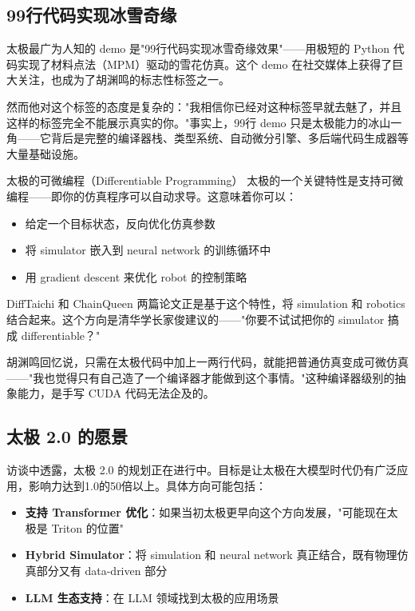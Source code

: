\documentclass[a4paper]{article}
\begin{document}
\subsection{99行代码实现冰雪奇缘}

太极最广为人知的 demo 是"99行代码实现冰雪奇缘效果"——用极短的 Python 代码实现了材料点法（MPM）驱动的雪花仿真。这个 demo 在社交媒体上获得了巨大关注，也成为了胡渊鸣的标志性标签之一。

然而他对这个标签的态度是复杂的："我相信你已经对这种标签早就去魅了，并且这样的标签完全不能展示真实的你。"事实上，99行 demo 只是太极能力的冰山一角——它背后是完整的编译器栈、类型系统、自动微分引擎、多后端代码生成器等大量基础设施。

\begin{knowledgebox}{太极的可微编程（Differentiable Programming）}
太极的一个关键特性是支持可微编程——即你的仿真程序可以自动求导。这意味着你可以：
\begin{itemize}
\item 给定一个目标状态，反向优化仿真参数
\item 将 simulator 嵌入到 neural network 的训练循环中
\item 用 gradient descent 来优化 robot 的控制策略
\end{itemize}
DiffTaichi 和 ChainQueen 两篇论文正是基于这个特性，将 simulation 和 robotics 结合起来。这个方向是清华学长家俊建议的——"你要不试试把你的 simulator 搞成 differentiable？"
\end{knowledgebox}

胡渊鸣回忆说，只需在太极代码中加上一两行代码，就能把普通仿真变成可微仿真——"我也觉得只有自己造了一个编译器才能做到这个事情。"这种编译器级别的抽象能力，是手写 CUDA 代码无法企及的。

\subsection{太极 2.0 的愿景}

访谈中透露，太极 2.0 的规划正在进行中。目标是让太极在大模型时代仍有广泛应用，影响力达到1.0的50倍以上。具体方向可能包括：

\begin{itemize}
\item \textbf{支持 Transformer 优化}：如果当初太极更早向这个方向发展，"可能现在太极是 Triton 的位置"
\item \textbf{Hybrid Simulator}：将 simulation 和 neural network 真正结合，既有物理仿真部分又有 data-driven 部分
\item \textbf{LLM 生态支持}：在 LLM 领域找到太极的应用场景
\end{itemize}
\end{document}
